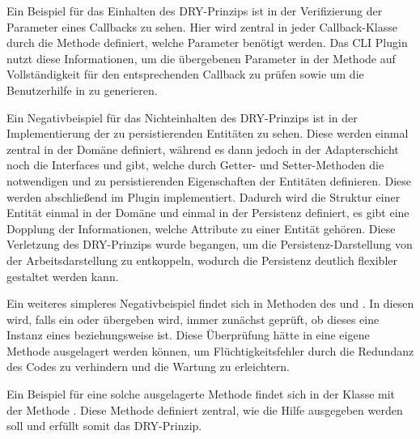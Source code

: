 Ein Beispiel für das Einhalten des DRY-Prinzips ist in der Verifizierung der Parameter eines Callbacks zu sehen. Hier wird zentral in jeder Callback-Klasse durch die Methode  definiert, welche Parameter benötigt werden. Das CLI Plugin nutzt diese Informationen, um die übergebenen Parameter in der Methode  auf Vollständigkeit für den entsprechenden Callback zu prüfen sowie um die Benutzerhilfe in  zu generieren.

Ein Negativbeispiel für das Nichteinhalten des DRY-Prinzips ist in der Implementierung der zu persistierenden Entitäten zu sehen. Diese werden einmal zentral in der Domäne definiert, während es dann jedoch in der Adapterschicht noch die Interfaces  und  gibt, welche durch Getter- und Setter-Methoden die notwendigen und zu persistierenden Eigenschaften der Entitäten definieren. Diese werden abschließend im  Plugin implementiert. Dadurch wird die Struktur einer Entität einmal in der Domäne und einmal in der Persistenz definiert, es gibt eine Dopplung der Informationen, welche Attribute zu einer Entität gehören. Diese Verletzung des DRY-Prinzips wurde begangen, um die Persistenz-Darstellung von der Arbeitsdarstellung zu entkoppeln, wodurch die Persistenz deutlich flexibler gestaltet werden kann.

Ein weiteres simpleres Negativbeispiel findet sich in Methoden des  und . In diesen wird, falls ein  oder  übergeben wird, immer zunächst geprüft, ob dieses eine Instanz eines  beziehungsweise  ist. Diese Überprüfung hätte in eine eigene Methode ausgelagert werden können, um Flüchtigkeitsfehler durch die Redundanz des Codes zu verhindern und die Wartung zu erleichtern.

Ein Beispiel für eine solche ausgelagerte Methode findet sich in der Klasse  mit der Methode . Diese Methode definiert zentral, wie die Hilfe ausgegeben werden soll und erfüllt somit das DRY-Prinzip.
